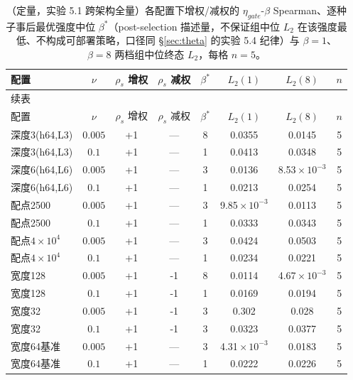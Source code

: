 \documentclass[fontset=windows,11pt]{ctexart}
\numberwithin{equation}{section}
\begin{document}
\begin{longtable}{lccccccc}
\caption{（定量，实验 5.1 跨架构全量）各配置下增权/减权的 $\eta_{gate}$-$\beta$ Spearman、逐种子事后最优强度中位 $\beta^*$（post-selection 描述量，不保证组中位 $L_2$ 在该强度最低、不构成可部署策略，口径同 \S\ref{sec:theta} 的实验 5.4 纪律）与 $\beta=1$、$\beta=8$ 两档组中位终态 $L_2$，每格 $n=5$。}\label{tab:app-r1}\\
\toprule
配置&$\nu$&$\rho_s$ 增权&$\rho_s$ 减权&$\beta^*$&$L_2(1)$&$L_2(8)$&$n$\\\midrule\endfirsthead
\multicolumn{8}{l}{\small 续表}\\\toprule
配置&$\nu$&$\rho_s$ 增权&$\rho_s$ 减权&$\beta^*$&$L_2(1)$&$L_2(8)$&$n$\\\midrule\endhead
深度3(h64,L3) & $0.005$ & +1 & — & 8 & 0.0355 & 0.0145 & 5 \\
深度3(h64,L3) & $0.1$ & +1 & — & 1 & 0.0413 & 0.0348 & 5 \\
深度6(h64,L6) & $0.005$ & +1 & — & 3 & 0.0136 & 8.53$\!\times\!10^{-3}$ & 5 \\
深度6(h64,L6) & $0.1$ & +1 & — & 1 & 0.0213 & 0.0254 & 5 \\
配点2500 & $0.005$ & +1 & — & 3 & 9.85$\!\times\!10^{-3}$ & 0.0113 & 5 \\
配点2500 & $0.1$ & +1 & — & 1 & 0.0333 & 0.0343 & 5 \\
配点$4\times10^4$ & $0.005$ & +1 & — & 3 & 0.0424 & 0.0503 & 5 \\
配点$4\times10^4$ & $0.1$ & +1 & — & 1 & 0.0234 & 0.0221 & 5 \\
宽度128 & $0.005$ & +1 & -1 & 8 & 0.0114 & 4.67$\!\times\!10^{-3}$ & 5 \\
宽度128 & $0.1$ & +1 & -1 & 1 & 0.0169 & 0.0194 & 5 \\
宽度32 & $0.005$ & +1 & -1 & 3 & 0.302 & 0.028 & 5 \\
宽度32 & $0.1$ & +1 & -1 & 3 & 0.0323 & 0.0377 & 5 \\
宽度64基准 & $0.005$ & +1 & — & 3 & 4.31$\!\times\!10^{-3}$ & 0.0183 & 5 \\
宽度64基准 & $0.1$ & +1 & — & 1 & 0.0222 & 0.0226 & 5\\\bottomrule
\end{longtable}
\end{document}

